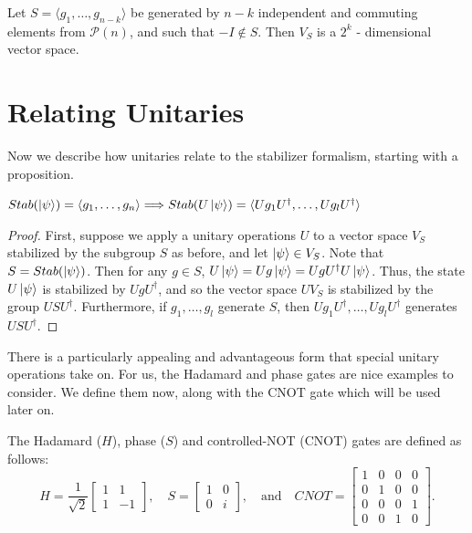 \documentclass[12pt]{dalthesis}
\begin{document}
\begin{proposition}
Let $S = \langle g_1, \dots , g_{n-k} \rangle$ be generated by $n-k$ independent and commuting elements from $\mathcal{P}(n)$, and such that $-I \not \in S$. Then $V_S$ is a $2^k$ - dimensional vector space.
\end{proposition}


\section{Relating Unitaries}
Now we describe how unitaries relate to the stabilizer formalism, starting with a proposition. 
\begin{proposition}
$Stab(\ket{\psi}) = \langle g_1 , \dots , g_n \rangle \Longrightarrow Stab(U\ket{\psi}) = \langle Ug_1U^{\dag}, \dots , Ug_lU^{\dag} \rangle$
\end{proposition}
\begin{proof}
First, suppose we apply a unitary operations $U$ to a vector space $V_S$ stabilized by the subgroup $S$ as before, and let $\ket{\psi} \in V_S$. Note that $S = Stab(\ket{\psi})$. Then for any $g \in S$, $U\ket{\psi} = Ug\ket{\psi} = UgU^{\dag}U\ket{\psi}$. Thus, the state $U\ket{\psi}$ is stabilized by $UgU^{\dag}$, and so the vector space $UV_S$ is stabilized by the group $USU^{\dag}$. Furthermore, if $g_1, \dots , g_l$ generate $S$, then $Ug_1U^{\dag}, \dots , Ug_lU^{\dag}$ generates $USU^{\dag}$.
\end{proof}

There is a particularly appealing and advantageous form that special unitary operations take on. For us, the Hadamard and phase gates are nice examples to consider. We define them now, along with the CNOT gate which will be used later on.

\begin{definition}
The Hadamard ($H$), phase ($S$) and controlled-NOT (CNOT) gates are defined as follows:
\begin{equation}
H = 
\frac{1}{\sqrt{2}} 
\begin{bmatrix}
1 & 1 \\
1 & -1
\end{bmatrix}, \quad
S = 
\begin{bmatrix}
1 & 0 \\
0 & i
\end{bmatrix}, \quad \mbox{and} \quad
CNOT = 
\begin{bmatrix}
1 & 0 & 0 & 0 \\
0 & 1 & 0 & 0 \\
0 & 0 & 0 & 1 \\
0 & 0 & 1 & 0
\end{bmatrix}.
\end{equation}
\end{definition}
\end{document}

